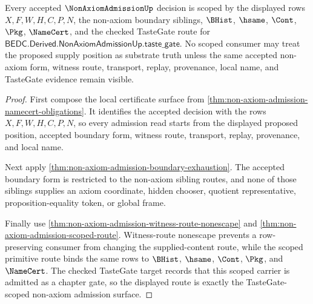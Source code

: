 \begin{theorem}
\label{thm:non-axiom-admission-scoped-tastegate-route}
Every accepted $\NonAxiomAdmissionUp$ decision is scoped by the displayed rows $X,F,W,H,C,P,N$, the non-axiom boundary siblings, $\BHist$, $\hsame$, $\Cont$, $\Pkg$, $\NameCert$, and the checked TasteGate route for $\mathsf{BEDC.Derived.NonAxiomAdmissionUp.taste\_gate}$. No scoped consumer may treat the proposed supply position as substrate truth unless the same accepted non-axiom form, witness route, transport, replay, provenance, local name, and TasteGate evidence remain visible.
\end{theorem}
\begin{proof}
First compose the local certificate surface from \autoref{thm:non-axiom-admission-namecert-obligations}. It identifies the accepted decision with the rows $X,F,W,H,C,P,N$, so every admission read starts from the displayed proposed position, accepted boundary form, witness route, transport, replay, provenance, and local name.

Next apply \autoref{thm:non-axiom-admission-boundary-exhaustion}. The accepted boundary form is restricted to the non-axiom sibling routes, and none of those siblings supplies an axiom coordinate, hidden chooser, quotient representative, proposition-equality token, or global frame.

Finally use \autoref{thm:non-axiom-admission-witness-route-nonescape} and \autoref{thm:non-axiom-admission-scoped-route}. Witness-route nonescape prevents a row-preserving consumer from changing the supplied-content route, while the scoped primitive route binds the same rows to $\BHist$, $\hsame$, $\Cont$, $\Pkg$, and $\NameCert$. The checked TasteGate target records that this scoped carrier is admitted as a chapter gate, so the displayed route is exactly the TasteGate-scoped non-axiom admission surface.
\end{proof}



